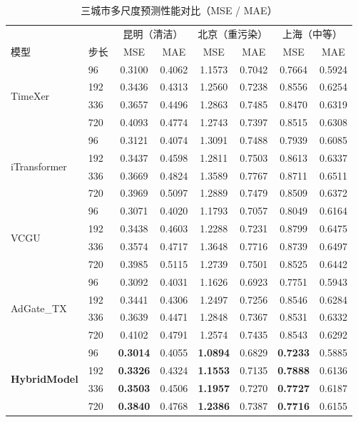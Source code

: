 \documentclass[12pt,a4paper]{article}
\begin{document}
\begin{table}[H]
\centering
\caption{三城市多尺度预测性能对比（MSE / MAE）}
\label{tab:threecities}
\small
\begin{tabular}{ll|cc|cc|cc}
\toprule
& & \multicolumn{2}{c|}{昆明（清洁）} & \multicolumn{2}{c|}{北京（重污染）} & \multicolumn{2}{c}{上海（中等）} \\
模型 & 步长 & MSE & MAE & MSE & MAE & MSE & MAE \\
\midrule
    \multirow{4}{*}{TimeXer}
    & 96 & 0.3100 & 0.4062 & 1.1573 & 0.7042 & 0.7664 & 0.5924 \\
    & 192 & 0.3436 & 0.4313 & 1.2560 & 0.7238 & 0.8556 & 0.6254 \\
    & 336 & 0.3657 & 0.4496 & 1.2863 & 0.7485 & 0.8470 & 0.6319 \\
    & 720 & 0.4093 & 0.4774 & 1.2743 & 0.7397 & 0.8515 & 0.6308 \\
    \midrule
    \multirow{4}{*}{iTransformer}
    & 96 & 0.3121 & 0.4074 & 1.3091 & 0.7488 & 0.7939 & 0.6085 \\
    & 192 & 0.3437 & 0.4598 & 1.2811 & 0.7503 & 0.8613 & 0.6337 \\
    & 336 & 0.3669 & 0.4824 & 1.3589 & 0.7767 & 0.8711 & 0.6511 \\
    & 720 & 0.3969 & 0.5097 & 1.2889 & 0.7479 & 0.8509 & 0.6372 \\
    \midrule
    \multirow{4}{*}{VCGU}
    & 96 & 0.3071 & 0.4020 & 1.1793 & 0.7057 & 0.8049 & 0.6164 \\
    & 192 & 0.3438 & 0.4603 & 1.2288 & 0.7231 & 0.8799 & 0.6475 \\
    & 336 & 0.3574 & 0.4717 & 1.3648 & 0.7716 & 0.8739 & 0.6497 \\
    & 720 & 0.3985 & 0.5115 & 1.2739 & 0.7501 & 0.8525 & 0.6442 \\
    \midrule
    \multirow{4}{*}{AdGate_TX}
    & 96 & 0.3092 & 0.4031 & 1.1626 & 0.6923 & 0.7751 & 0.5943 \\
    & 192 & 0.3441 & 0.4306 & 1.2497 & 0.7256 & 0.8546 & 0.6284 \\
    & 336 & 0.3639 & 0.4471 & 1.2848 & 0.7367 & 0.8531 & 0.6332 \\
    & 720 & 0.4102 & 0.4791 & 1.2574 & 0.7435 & 0.8543 & 0.6292 \\
    \midrule
    \multirow{4}{*}{\textbf{HybridModel}}
    & 96 & \textbf{0.3014} & 0.4055 & \textbf{1.0894} & 0.6829 & \textbf{0.7233} & 0.5885 \\
    & 192 & \textbf{0.3326} & 0.4324 & \textbf{1.1553} & 0.7135 & \textbf{0.7888} & 0.6136 \\
    & 336 & \textbf{0.3503} & 0.4506 & \textbf{1.1957} & 0.7270 & \textbf{0.7727} & 0.6187 \\
    & 720 & \textbf{0.3840} & 0.4768 & \textbf{1.2386} & 0.7387 & \textbf{0.7716} & 0.6155 \\
    \bottomrule
\end{tabular}
\end{table}
\end{document}
